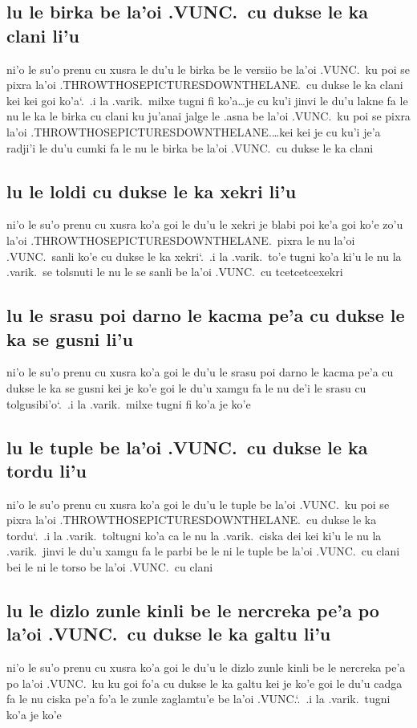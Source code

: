 \documentclass{report}
\newcommand\sds{\spacefactor\sfcode`.\ \space}
\begin{document}
\subsection{lu le birka be la'oi .VUNC.\ cu dukse le ka clani li'u}
ni'o le su'o prenu cu xusra le du'u le birka be le versiio be la'oi .VUNC.\ ku poi se pixra la'oi .THROWTHOSEPICTURESDOWNTHELANE.\ cu dukse le ka clani kei kei goi ko'a\sds  .i la .varik.\ milxe tugni fi ko'a\ldots je cu ku'i jinvi le du'u lakne fa le nu le ka le birka cu clani ku ju'anai jalge le .asna be la'oi .VUNC.\ ku poi se pixra la'oi .THROWTHOSEPICTURESDOWNTHELANE.\ldots kei kei je cu ku'i je'a radji'i le du'u cumki fa le nu le birka be la'oi .VUNC.\ cu dukse le ka clani

\subsection{lu le loldi cu dukse le ka xekri li'u}
ni'o le su'o prenu cu xusra ko'a goi le du'u le xekri je blabi poi ke'a goi ko'e zo'u la'oi .THROWTHOSEPICTURESDOWNTHELANE.\ pixra le nu la'oi .VUNC.\ sanli ko'e cu dukse le ka xekri\sds  .i la .varik.\ to'e tugni ko'a ki'u le nu la .varik.\ se tolsnuti le nu le se sanli be la'oi .VUNC.\ cu tcetcetcexekri

\subsection{lu le srasu poi darno le kacma pe'a cu dukse le ka se gusni li'u}
ni'o le su'o prenu cu xusra ko'a goi le du'u le srasu poi darno le kacma pe'a cu dukse le ka se gusni kei je ko'e goi le du'u xamgu fa le nu de'i le srasu cu tolgusibi'o\sds  .i la .varik.\ milxe tugni fi ko'a je ko'e

\subsection{lu le tuple be la'oi .VUNC.\ cu dukse le ka tordu li'u}
ni'o le su'o prenu cu xusra ko'a goi le du'u le tuple be la'oi .VUNC.\ ku poi se pixra la'oi .THROWTHOSEPICTURESDOWNTHELANE.\ cu dukse le ka tordu\sds  .i la .varik.\ toltugni ko'a ca le nu la .varik.\ ciska dei kei ki'u le nu la .varik.\ jinvi le du'u xamgu fa le parbi be le ni le tuple be la'oi .VUNC.\ cu clani bei le ni le torso be la'oi .VUNC.\ cu clani

\subsection{lu le dizlo zunle kinli be le nercreka pe'a po la'oi .VUNC.\ cu dukse le ka galtu li'u}
ni'o le su'o prenu cu xusra ko'a goi le du'u le dizlo zunle kinli be le nercreka pe'a po la'oi .VUNC.\ ku ku goi fo'a cu dukse le ka galtu kei je ko'e goi le du'u cadga fa le nu ciska pe'a fo'a le zunle zaglamtu'e be la'oi .VUNC.\sds  .i la .varik.\ tugni ko'a je ko'e
\end{document}

